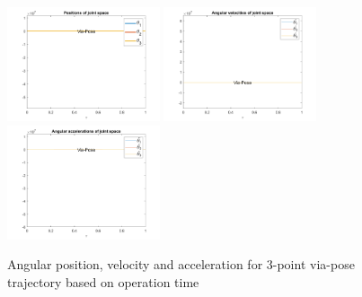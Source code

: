 \documentclass[conference]{IEEEtran}
\begin{document}
\begin{figure}[htbp]
    \centering
    \includegraphics[width=0.4\textwidth]{figures/prob5/theta_i/position_Via-Pose.png}
    \includegraphics[width=0.4\textwidth]{figures/prob5/theta_i/velocity_Via-Pose.png}
    \includegraphics[width=0.4\textwidth]{figures/prob5/theta_i/acceleration_Via-Pose.png}
    \caption{Angular position, velocity and acceleration for 3-point via-pose trajectory based on operation time}
    \label{fig:res6}
\end{figure}
\end{document}
